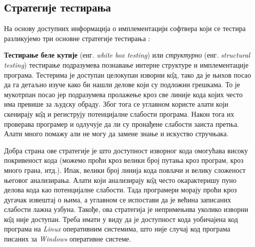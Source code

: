 \documentclass[12pt,oneside]{memoir}
\begin{document}
\subsection{Стратегије тестирања}
\label{subsec:stratTest}

На основу доступних информација о имплементацији софтвера који се тестира разликујемо три основне стратегије тестирања \cite{fuzzingBrute, fuzzing, testMilena}: 

\begin{description}
\item \textbf{Тестирање беле кутије} (енг. \textit{white box testing}) или \textit{структурно} (енг. \textit{structural testing}) тестирање подразумева познавање интерне структуре и имплементације програма. Тестерима је доступан целокупан изворни к\^{о}д, тако да је њихов посао да га детаљно изуче како би нашли делове који су подложни грешкама. То је мукотрпан посао јер подразумева пролажење кроз све линије кода којих често има превише за људску обраду. Због тога се углавном користе алати који скенирају к\^{о}д и региструју потенцијалне слабости програма. Након тога их проверава програмер и одлучује да ли су пронађене слабости заиста претња. Алати много помажу али не могу да замене знање и искуство стручњака. 
\par Добра страна ове стратегије је што доступност изворног кода омогућава високу покривеност кода (можемо проћи кроз велики број путања кроз програм, кроз много грана, итд.). Ипак, велики број линија кода повлачи и велику сложеност његовог анализирања. Алати који анализирају к\^{о}д често окарактеришу пуно делова кода као потенцијалне слабости. Тада програмери морају проћи кроз дугачак извештај о њима, а углавном се испостави да је већина записаних слабости лажна узбуна. Такође, ова стратегија је непримењива уколико изворни к\^{о}д није доступан. Треба имати у виду да је доступност кода уобичајена код програма на \textit{Linux} оперативним системима, што није случај код програма писаних за \textit{Windows} оперативне системе. 


\end{description}
\end{document}
